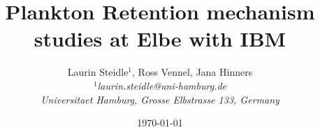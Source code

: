 \documentclass[a4paper, 10pt, twocolumn]{article}
\begin{document}
\date{\small\today}                                        %
\title{
	\vspace{-20mm}\textbf{	\large 
	Plankton Retention mechanism studies at Elbe with IBM}
	}
\author{
	Laurin Steidle\(^1\), Ross Vennel, Jana Hinners \\
	\emph{
		\small
		\(^1\)laurin.steidle@uni-hamburg.de} \\
	\emph{
		\small Universitaet Hamburg, Grosse Elbstrasse 133, Germany}
		}

\twocolumn[
	\begin{@twocolumnfalse}
		\maketitle
  	\end{@twocolumnfalse}
]





\end{document}
